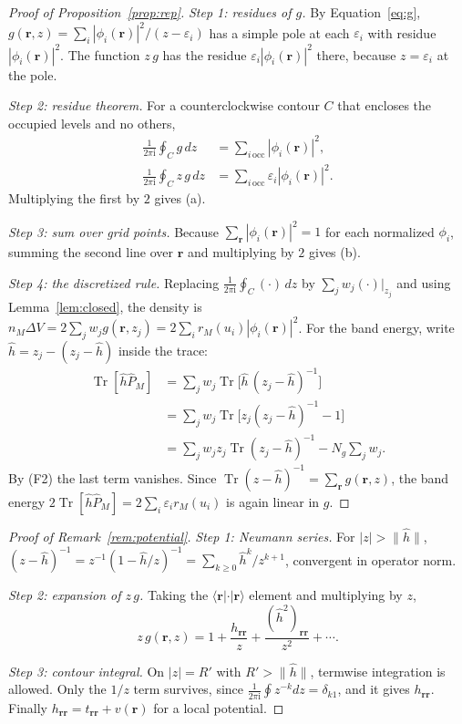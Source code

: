 \documentclass[aps,prb,twocolumn,superscriptaddress,floatfix,longbibliography]{revtex4-2}
\theoremstyle{remark}
\newcommand{\Tr}{\operatorname{Tr}}
\newcommand{\ii}{\mathrm{i}}
\begin{document}
\begin{proof}[Proof of Proposition~\ref{prop:rep}]
\emph{Step 1: residues of $g$.} By Equation~\eqref{eq:g}, $g(\bm r,z)=\sum_i|\phi_i(\bm r)|^2/(z-\varepsilon_i)$ has a simple pole at
each $\varepsilon_i$ with residue $|\phi_i(\bm r)|^2$. The function $z\,g$ has the residue
$\varepsilon_i|\phi_i(\bm r)|^2$ there, because $z=\varepsilon_i$ at the pole.

\emph{Step 2: residue theorem.} For a counterclockwise contour $C$ that encloses the occupied levels and no others,
\begin{align}
\frac{1}{2\pi\ii}\oint_Cg\,dz&=\sum_{i\,\mathrm{occ}}|\phi_i(\bm r)|^2,\\
\frac{1}{2\pi\ii}\oint_Cz\,g\,dz&=\sum_{i\,\mathrm{occ}}\varepsilon_i|\phi_i(\bm r)|^2 .
\end{align}
Multiplying the first by $2$ gives (a).

\emph{Step 3: sum over grid points.} Because $\sum_{\bm r}|\phi_i(\bm r)|^2=1$ for each normalized $\phi_i$, summing the
second line over $\bm r$ and multiplying by $2$ gives (b).

\emph{Step 4: the discretized rule.} Replacing $\frac{1}{2\pi\ii}\oint_C(\cdot)\,dz$ by $\sum_jw_j(\cdot)|_{z_j}$ and using
Lemma~\ref{lem:closed}, the density is
$n_M\Delta V=2\sum_jw_jg(\bm r,z_j)=2\sum_ir_M(u_i)|\phi_i(\bm r)|^2$. For the band energy, write
$\hat h=z_j-(z_j-\hat h)$ inside the trace:
\begin{align}
\Tr[\hat h\hat P_M]
&=\sum_jw_j\Tr\big[\hat h\,(z_j-\hat h)^{-1}\big]\nonumber\\
&=\sum_jw_j\Tr\big[z_j(z_j-\hat h)^{-1}-1\big]\nonumber\\
&=\sum_jw_jz_j\Tr(z_j-\hat h)^{-1}-N_g\sum_jw_j .
\end{align}
By (F2) the last term vanishes. Since $\Tr(z-\hat h)^{-1}=\sum_{\bm r}g(\bm r,z)$, the band energy
$2\Tr[\hat h\hat P_M]=2\sum_i\varepsilon_ir_M(u_i)$ is again linear in $g$.
\end{proof}

\begin{proof}[Proof of Remark~\ref{rem:potential}]
\emph{Step 1: Neumann series.} For $|z|>\|\hat h\|$,
$(z-\hat h)^{-1}=z^{-1}(1-\hat h/z)^{-1}=\sum_{k\ge0}\hat h^k/z^{k+1}$, convergent in operator norm.

\emph{Step 2: expansion of $z\,g$.} Taking the $\langle\bm r|\cdot|\bm r\rangle$ element and multiplying by $z$,
\begin{equation}
z\,g(\bm r,z)=1+\frac{h_{\bm r\bm r}}{z}+\frac{(\hat h^2)_{\bm r\bm r}}{z^2}+\cdots .
\end{equation}

\emph{Step 3: contour integral.} On $|z|=R'$ with $R'>\|\hat h\|$, termwise integration is allowed. Only the $1/z$ term
survives, since $\frac{1}{2\pi\ii}\oint z^{-k}dz=\delta_{k1}$, and it gives $h_{\bm r\bm r}$. Finally
$h_{\bm r\bm r}=t_{\bm r\bm r}+v(\bm r)$ for a local potential.
\end{proof}
\end{document}
